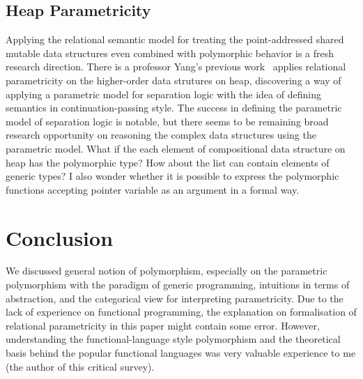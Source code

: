 \documentclass[sigconf]{acmart}
\begin{document}
\subsection{Heap Parametricity}
Applying the relational semantic model for treating the point-addressed shared mutable data structures even combined with polymorphic behavior is a fresh research direction. There is a professor Yang's previous work~\cite{yang08} applies relational parametricity on the higher-order data strutures on heap, discovering a way of applying a parametric model for separation logic with the idea of defining semantics in continuation-passing style. The success in defining the parametric model of separation logic is notable, but there seems to be remaining broad research opportunity on reasoning the complex data structures using the parametric model. What if the each element of compositional data structure on heap has the polymorphic type? How about the list can contain elements of generic types? I also wonder whether it is possible to express the polymorphic functions accepting pointer variable as an argument in a formal way.

\section{Conclusion}
\label{sec:conclusion}

We discussed general notion of polymorphism, especially on the parametric polymorphism with the paradigm of generic programming, intuitions in terms of abstraction, and the categorical view for interpreting parametricity. Due to the lack of experience on functional programming, the explanation on formalisation of relational parametricity in this paper might contain some error. However, understanding the functional-language style polymorphism and the theoretical basis behind the popular functional languages was very valuable experience to me (the author of this critical survey).



\end{document}
